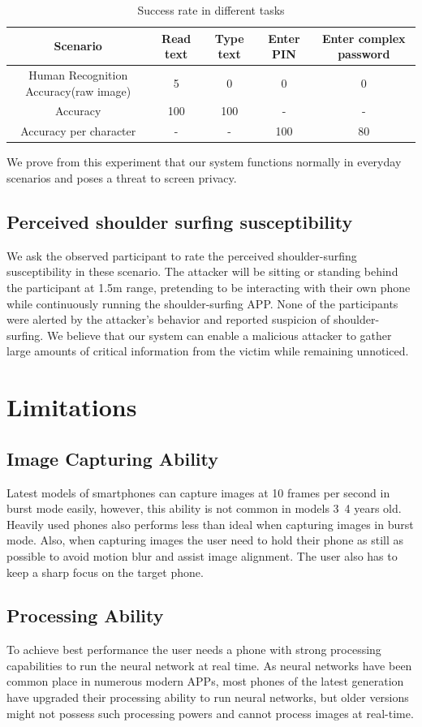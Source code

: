 \begin{table}  
\begin{tabular}{c|c|c|c|c} 
Scenario & Read text & Type text & Enter PIN & Enter complex password\\ \hline
Human Recognition Accuracy(raw image) & 5 & 0 & 0 & 0\\ \hline
Accuracy & 100 & 100 & - & -\\ \hline
Accuracy per character& - & - & 100 & 80\\ 
\end{tabular}
\caption{Success rate in different tasks}
\label{table-task}
\end{table}

We prove from this experiment that our system functions normally in everyday scenarios and poses a threat to screen privacy.

\subsection{Perceived shoulder surfing susceptibility}
We ask the observed participant to rate the perceived shoulder-surfing susceptibility in these scenario. The attacker will be sitting or standing behind the participant at 1.5m range, pretending to be interacting with their own phone while continuously running the shoulder-surfing APP. None of the participants were alerted by the attacker's behavior and reported suspicion of shoulder-surfing. We believe that our system can enable a malicious attacker to gather large amounts of critical information from the victim while remaining unnoticed.
\section{Limitations}
\subsection{Image Capturing Ability}
Latest models of smartphones can capture images at 10 frames per second in burst mode easily, however, this ability is not common in models 3~4 years old. Heavily used phones also performs less than ideal when capturing images in burst mode. Also, when capturing images the user need to hold their phone as still as possible to avoid motion blur and assist image alignment. The user also has to keep a sharp focus on the target phone.
\subsection{Processing Ability}
To achieve best performance the user needs a phone with strong processing capabilities to run the neural network at real time. As neural networks have been common place in numerous modern APPs, most phones of the latest generation have upgraded their processing ability to run neural networks, but older versions might not possess such processing powers and cannot process images at real-time.
